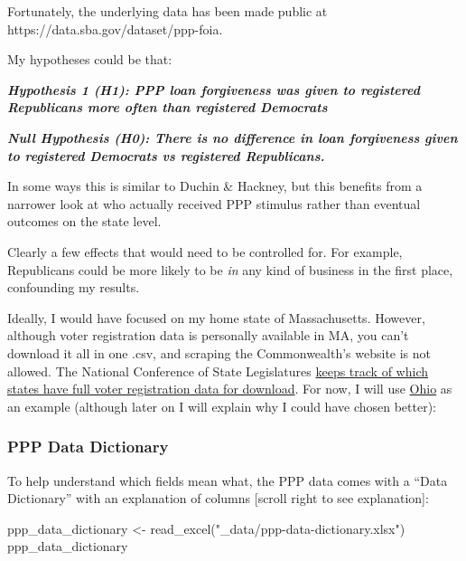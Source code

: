 \documentclass[
  letterpaper,
  DIV=11,
  numbers=noendperiod]{scrartcl}
\newenvironment{Shaded}{\begin{snugshade}}{\end{snugshade}}
\newcommand{\FunctionTok}[1]{\textcolor[rgb]{0.28,0.35,0.67}{#1}}
\newcommand{\NormalTok}[1]{\textcolor[rgb]{0.00,0.23,0.31}{#1}}
\newcommand{\OtherTok}[1]{\textcolor[rgb]{0.00,0.23,0.31}{#1}}
\newcommand{\StringTok}[1]{\textcolor[rgb]{0.13,0.47,0.30}{#1}}
\begin{document}
Fortunately, the underlying data has been made public at
https://data.sba.gov/dataset/ppp-foia.

My hypotheses could be that:

\textbf{\emph{Hypothesis 1 (H1): PPP loan forgiveness was given to
registered Republicans more often than registered Democrats}}

\textbf{\emph{Null Hypothesis (H0): There is no difference in loan
forgiveness given to registered Democrats vs registered Republicans.}}

In some ways this is similar to Duchin \& Hackney, but this benefits
from a narrower look at who actually received PPP stimulus rather than
eventual outcomes on the state level.

Clearly a few effects that would need to be controlled for. For example,
Republicans could be more likely to be \emph{in} any kind of business in
the first place, confounding my results.

Ideally, I would have focused on my home state of Massachusetts.
However, although voter registration data is personally available in MA,
you can't download it all in one .csv, and scraping the Commonwealth's
website is not allowed. The National Conference of State Legislatures
\href{https://www.ncsl.org/research/elections-and-campaigns/access-to-and-use-of-voter-registration-lists.aspx}{keeps
track of which states have full voter registration data for download}.
For now, I will use
\href{https://www6.ohiosos.gov/ords/f?p=VOTERFTP:STWD:::\#stwdVtrFiles}{Ohio}
as an example (although later on I will explain why I could have chosen
better):

\hypertarget{ppp-data-dictionary}{%
\subsubsection{PPP Data Dictionary}\label{ppp-data-dictionary}}

To help understand which fields mean what, the PPP data comes with a
``Data Dictionary'' with an explanation of columns {[}scroll right to
see explanation{]}:

\begin{Shaded}
\begin{Highlighting}[]
\NormalTok{ppp\_data\_dictionary }\OtherTok{\textless{}{-}} \FunctionTok{read\_excel}\NormalTok{(}\StringTok{"\_data/ppp{-}data{-}dictionary.xlsx"}\NormalTok{)}
\NormalTok{ppp\_data\_dictionary}
\end{Highlighting}
\end{Shaded}
\end{document}
